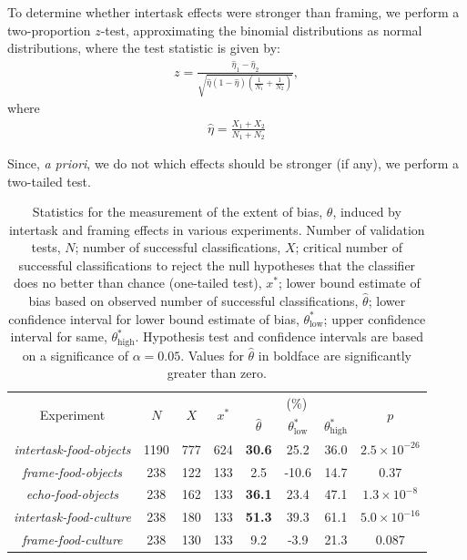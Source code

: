 \documentclass[12pt]{article}
\begin{document}
To determine whether intertask effects were stronger than framing, we 
perform a two-proportion $z$-test, approximating the binomial distributions
as normal distributions, where the test statistic is given by:
\begin{align}
	z = \frac{\hat{\eta}_1 - \hat{\eta}_2}
		{\sqrt{
			\hat{\eta} (1 - \hat{\eta}) 
			\left( \frac{1}{N_1} + \frac{1}{N_2}\right)
		}},
\end{align}
where
\begin{align}
	\hat{\eta} = \frac{X_1 + X_2}{N_1 + N_2}
\end{align}


Since, \textit{a priori}, we do not which effects
should be stronger (if any), we perform a two-tailed test.


\begin{table}
\begin{center}
\begin{tabular}{c c c c c c c c }
	\toprule
	\multirow{2}{*}{Experiment} & \multirow{2}{*}{$N$} & 
	\multirow{2}{*}{$X$} & \multirow{2}{*}{$x^*$} & \multicolumn{3}{c}{(\%)}
		& \multirow{2}{*}{$p$}\\ \cline{5-7} \noalign{\smallskip}
	& & & & $\hat{\theta}$ & $\theta^*_\mathrm{low}$ 
		& $\theta^*_\mathrm{high}$  \\
	\midrule
	\textit{intertask-food-objects} & 1190 & 777 & 624 & \textbf{30.6} 
		& 25.2 & 36.0 & $2.5 \times 10^{-26}$ \\
	\textit{frame-food-objects} & 238 & 122 & 133 & 2.5 & -10.6 & 14.7
		& 0.37 \\
	\textit{echo-food-objects} & 238 & 162 &  133 & \textbf{36.1} & 23.4 
		& 47.1 & $1.3 \times 10^{-8}$ \\
	\textit{intertask-food-culture} & 238 & 180 & 133 & \textbf{51.3} & 39.3 
		& 61.1 & $5.0 \times 10^{-16}$ \\
	\textit{frame-food-culture} & 238 & 130 & 133 & 9.2 & -3.9 & 21.3 
		& 0.087\\
	\bottomrule

\end{tabular}

\caption{Statistics for the measurement of the extent of bias, $\theta$,
	induced by intertask and framing effects in various experiments.
	Number of validation tests, $N$; number of successful classifications, 
	$X$; critical number of successful classifications to reject the null 
	hypotheses that the classifier does no better than chance 
	(one-tailed test), $x^*$; 
	lower bound estimate of bias based on observed number of successful
	classifications, $\hat{\theta}$; lower confidence interval for lower
	bound estimate of bias, $\theta^*_\mathrm{low}$; upper confidence 
	interval for same, $\theta^*_\mathrm{high}$.  Hypothesis test and 
	confidence intervals are based on a significance of $\alpha=0.05$.
	Values for $\hat{\theta}$ in boldface are significantly greater than zero.
}
\label{table:theta}
\end{center}
\end{table}
\end{document}
